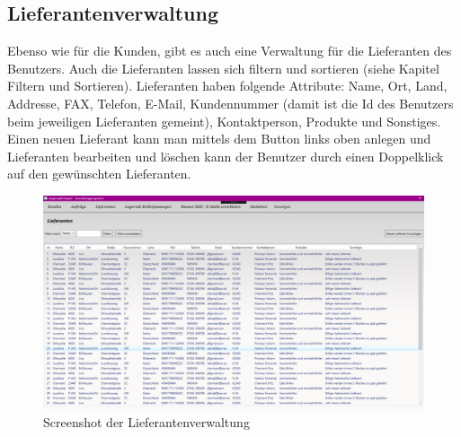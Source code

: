 \subsection{Lieferantenverwaltung}
Ebenso wie für die Kunden, gibt es auch eine Verwaltung für die Lieferanten des Benutzers. Auch die Lieferanten lassen sich filtern und sortieren (siehe Kapitel Filtern und Sortieren). Lieferanten haben folgende Attribute: Name, Ort, Land, Addresse, FAX, Telefon, E-Mail, Kundennummer (damit ist die Id des Benutzers beim jeweiligen Lieferanten gemeint), Kontaktperson, Produkte und Sonstiges. Einen neuen Lieferant kann man mittels dem Button links oben anlegen und Lieferanten bearbeiten und löschen kann der Benutzer durch einen Doppelklick auf den gewünschten Lieferanten.
\begin{figure}[H]
\begin{center}
	\includegraphics[scale=.25]{images/Lieferanten.png}
\end{center}
	\caption{Screenshot der Lieferantenverwaltung}
	\label{fig:sample}
\end{figure}
